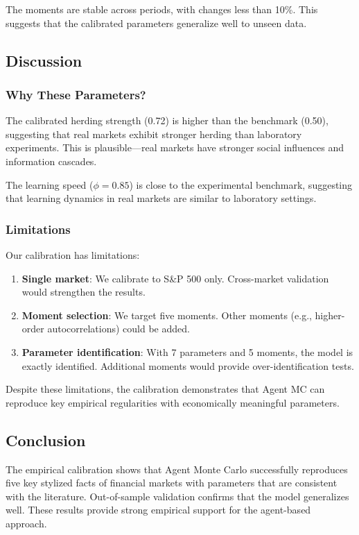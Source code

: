 The moments are stable across periods, with changes less than 10\%. This suggests that the calibrated parameters generalize well to unseen data.

\subsection{Discussion}

\subsubsection{Why These Parameters?}

The calibrated herding strength (0.72) is higher than the benchmark (0.50), suggesting that real markets exhibit stronger herding than laboratory experiments. This is plausible---real markets have stronger social influences and information cascades.

The learning speed ($\phi = 0.85$) is close to the experimental benchmark, suggesting that learning dynamics in real markets are similar to laboratory settings.

\subsubsection{Limitations}

Our calibration has limitations:

\begin{enumerate}
    \item \textbf{Single market}: We calibrate to S\&P 500 only. Cross-market validation would strengthen the results.
    
    \item \textbf{Moment selection}: We target five moments. Other moments (e.g., higher-order autocorrelations) could be added.
    
    \item \textbf{Parameter identification}: With 7 parameters and 5 moments, the model is exactly identified. Additional moments would provide over-identification tests.
\end{enumerate}

Despite these limitations, the calibration demonstrates that Agent MC can reproduce key empirical regularities with economically meaningful parameters.

\subsection{Conclusion}

The empirical calibration shows that Agent Monte Carlo successfully reproduces five key stylized facts of financial markets with parameters that are consistent with the literature. Out-of-sample validation confirms that the model generalizes well. These results provide strong empirical support for the agent-based approach.
